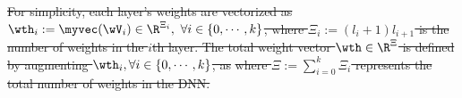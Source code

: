 \documentclass[letterpaper, journal]{IEEEtran}
\providecommand{\DIFdel}[1]{{\protect\color{red}\sout{#1}}} %
\providecommand{\DIFdelbegin}{} %
\begin{document}
\DIFdelbegin \DIFdel{For simplicity, each layer's weights are vectorized as $\wth_i:=\myvec(\wV_i)\in\R^{\Xi_i},\ \forall i\in\{0,\cdots,k\}$, where $\Xi_i:= (l_i+1)l_{i+1}$ is the number of weights in the $i$th layer.
The total weight vector $\wth\in\R^{\Xi}$ is defined by augmenting $\wth_i, \forall i\in \{0,\cdots,k\}$, as 
}%
\DIFdel{where $\Xi:={\sum_{i=0}^{k} \Xi_i}$ represents the total number of weights in the DNN.
}%
\end{document}
